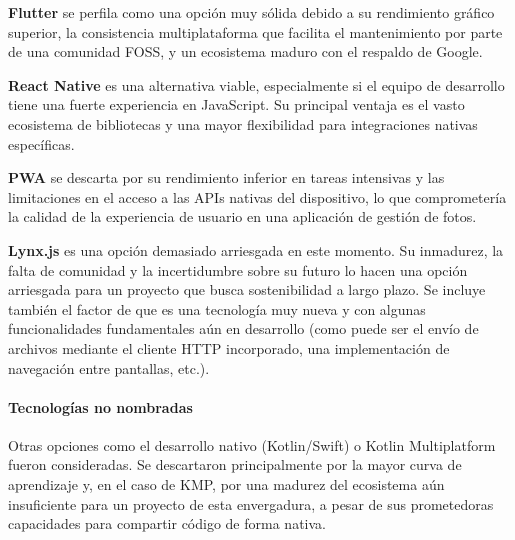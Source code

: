 \textbf{Flutter} se perfila como una opción muy sólida debido a su rendimiento gráfico superior, la consistencia multiplataforma que facilita el mantenimiento por parte de una comunidad FOSS, y un ecosistema maduro con el respaldo de Google.

\textbf{React Native} es una alternativa viable, especialmente si el equipo de desarrollo tiene una fuerte experiencia en JavaScript. Su principal ventaja es el vasto ecosistema de bibliotecas y una mayor flexibilidad para integraciones nativas específicas.

\textbf{PWA} se descarta por su rendimiento inferior en tareas intensivas y las limitaciones en el acceso a las APIs nativas del dispositivo, lo que comprometería la calidad de la experiencia de usuario en una aplicación de gestión de fotos.

\textbf{Lynx.js} es una opción demasiado arriesgada en este momento. Su inmadurez, la falta de comunidad y la incertidumbre sobre su futuro lo hacen una opción arriesgada para un proyecto que busca sostenibilidad a largo plazo.
Se incluye también el factor de que es una tecnología muy nueva y con algunas funcionalidades fundamentales aún en desarrollo (como puede ser el envío de archivos mediante el cliente HTTP incorporado, una implementación de navegación entre pantallas, etc.).

\paragraph{Tecnologías no nombradas}
Otras opciones como el desarrollo nativo (Kotlin/Swift) o Kotlin Multiplatform fueron consideradas. Se descartaron principalmente por la mayor curva de aprendizaje y, en el caso de KMP, por una madurez del ecosistema aún insuficiente para un proyecto de esta envergadura, a pesar de sus prometedoras capacidades para compartir código de forma nativa.
